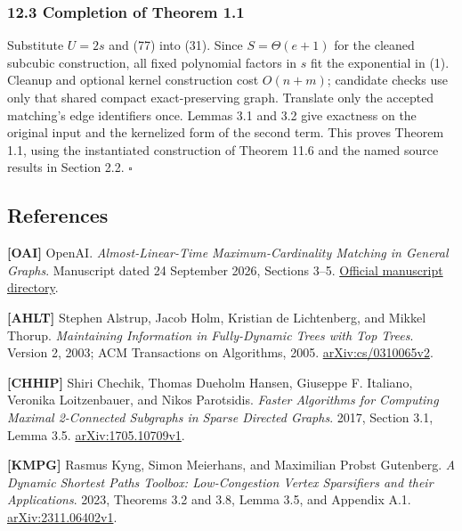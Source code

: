 \hypertarget{af-46593eb93e-completion-of-theorem-1.1}{%
\subsubsection{12.3 Completion of Theorem 1.1}\label{af-46593eb93e-completion-of-theorem-1.1}}

Substitute \(U=2s\) and (77) into (31). Since \(S=\Theta(e+1)\) for the cleaned subcubic construction, all fixed polynomial factors in \(s\) fit the exponential in (1). Cleanup and optional kernel construction cost \(O(n+m)\); candidate checks use only that shared compact exact-preserving graph. Translate only the accepted matching's edge identifiers once. Lemmas 3.1 and 3.2 give exactness on the original input and the kernelized form of the second term. This proves Theorem 1.1, using the instantiated construction of Theorem 11.6 and the named source results in Section 2.2. \hfill\(\square\)

\hypertarget{af-46593eb93e-references}{%
\subsection{References}\label{af-46593eb93e-references}}

\textbf{{[}OAI{]}} OpenAI. \emph{Almost-Linear-Time Maximum-Cardinality Matching in General Graphs}. Manuscript dated 24 September 2026, Sections 3--5. \href{https://github.com/openai/math/tree/main/preprints/Almost-Linear-Time-Maximum-Cardinality-Matching-in-Sparse-General-Graphs-September-24-2026}{Official manuscript directory}.

\textbf{{[}AHLT{]}} Stephen Alstrup, Jacob Holm, Kristian de Lichtenberg, and Mikkel Thorup. \emph{Maintaining Information in Fully-Dynamic Trees with Top Trees}. Version 2, 2003; ACM Transactions on Algorithms, 2005. \href{https://arxiv.org/abs/cs/0310065v2}{arXiv:cs/0310065v2}.

\textbf{{[}CHHIP{]}} Shiri Chechik, Thomas Dueholm Hansen, Giuseppe F. Italiano, Veronika Loitzenbauer, and Nikos Parotsidis. \emph{Faster Algorithms for Computing Maximal 2-Connected Subgraphs in Sparse Directed Graphs}. 2017, Section 3.1, Lemma 3.5. \href{https://arxiv.org/abs/1705.10709v1}{arXiv:1705.10709v1}.

\textbf{{[}KMPG{]}} Rasmus Kyng, Simon Meierhans, and Maximilian Probst Gutenberg. \emph{A Dynamic Shortest Paths Toolbox: Low-Congestion Vertex Sparsifiers and their Applications}. 2023, Theorems 3.2 and 3.8, Lemma 3.5, and Appendix A.1. \href{https://arxiv.org/abs/2311.06402v1}{arXiv:2311.06402v1}.


